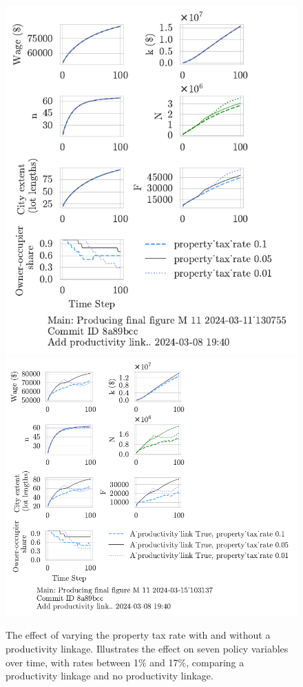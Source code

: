 \begin{figure}[h!tb] 
    \centering
    \includegraphics[scale=.75, trim={0 1.4cm .8cm 0},clip]{fig/property_tax_rate-Main-130755.pdf} 
    \includegraphics[scale=.75, trim={0 1.4cm 4.75cm 0},clip]{fig/With-productivity_link-property_tax-103137.pdf} 
    \caption[The effect of varying the property tax rate with and without a productivity linkage]{The effect of varying the property tax rate with and without a productivity linkage. Illustrates the effect on seven policy variables over time, with rates between 1\% and 17\%, comparing a productivity linkage and no productivity linkage.}
    \label{fig:Productivity_link_W-WO-property_tax}
\end{figure}

